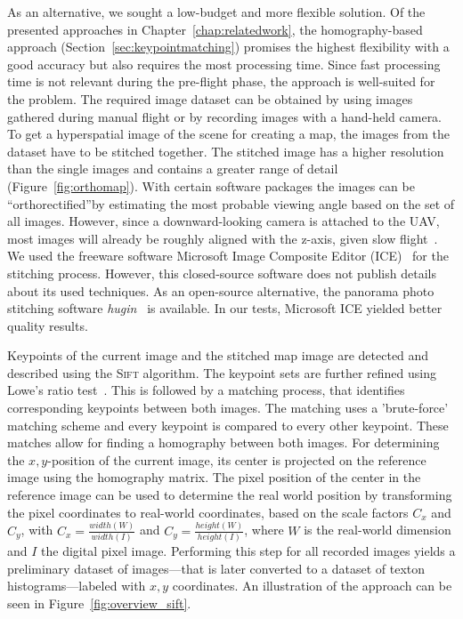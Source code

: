 \documentclass[11pt]{report}
\begin{document}
As an alternative, we sought a low-budget and more flexible
solution. Of the presented approaches in Chapter~\ref{chap:relatedwork},
the homography-based approach (Section~\ref{sec:keypointmatching})
promises the highest flexibility with a good accuracy but also
requires the most processing time. Since fast processing time is not
relevant during the pre-flight phase, the approach is well-suited for
the problem.
The required image dataset can be obtained by using images gathered
during manual flight or by recording images with a hand-held
camera. To get a hyperspatial image of the scene for creating a map,
the images from the dataset have to be stitched together. The stitched
image has a higher resolution than the single images and contains a
greater range of detail (Figure~\ref{fig:orthomap}).  With certain
software packages the images can be ``orthorectified''by estimating
the most probable viewing angle based on the set of all
images. However, since a downward-looking camera is attached to the
UAV, most images will already be roughly aligned with the z-axis,
given slow flight~\cite{blosch2010vision}.  We used the freeware
software Microsoft Image Composite Editor (ICE)~\cite{ice} for the
stitching process. However, this closed-source software does not
publish details about its used techniques. As an open-source
alternative, the panorama photo stitching software
\emph{hugin}~\cite{hugin} is available. In our tests, Microsoft ICE
yielded better quality results.

Keypoints of the current image and the stitched map image are detected
and described using the \textsc{Sift} algorithm. The keypoint sets are
further refined using Lowe's ratio test~\cite{lowe1999object}. This is
followed by a matching process, that identifies corresponding
keypoints between both images. The matching uses a 'brute-force'
matching scheme and every keypoint is compared to every other
keypoint. These matches allow for finding a homography between both
images. For determining the $x, y$-position of the current image, its
center is projected on the reference image using the homography
matrix. The pixel position of the center in the reference image can be
used to determine the real world position by transforming the pixel
coordinates to real-world coordinates, based on the scale factors
$C_x$ and $C_y$, with $C_x = \frac{width(W)}{width(I)}$ and
$C_y = \frac{height(W)}{height(I)}$, where $W$ is the real-world
dimension and $I$ the digital pixel image. Performing this step for
all recorded images yields a preliminary dataset of images---that is
later converted to a dataset of texton histograms---labeled with
$x, y$ coordinates. An illustration of the approach can be seen in
Figure~\ref{fig:overview_sift}.
\end{document}
